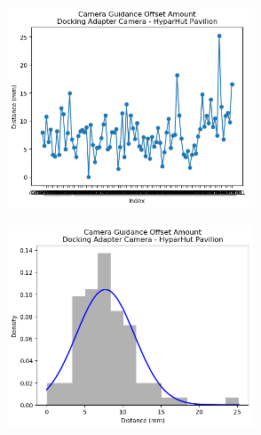 \documentclass[11pt]{book}
\begin{document}
\begin{figure}[H]
\centering
\begin{subfigure}[b]{0.45\textwidth}
\centering
\includegraphics[width=\textwidth]{./images/image59.png}
\end{subfigure}
\hfill
\begin{subfigure}[b]{0.45\textwidth}
\centering
\includegraphics[width=\textwidth]{./images/image60.png}
\end{subfigure}
\end{figure}
\end{document}
